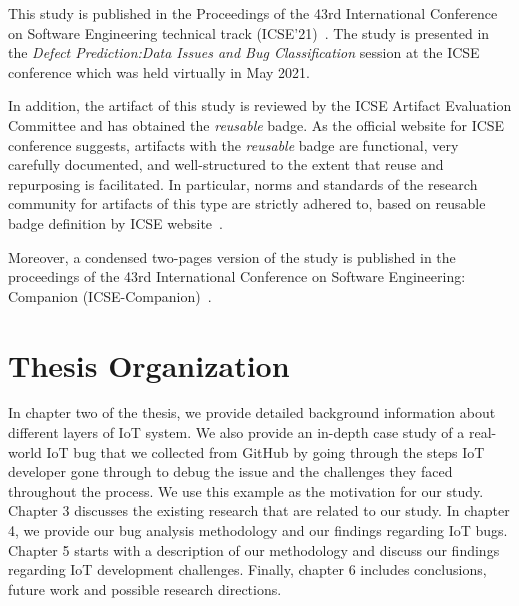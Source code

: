 This study is published in the Proceedings of the 43rd International Conference on Software Engineering technical track (ICSE'21)~\cite{makhshari2021iot}. The study is presented in the \textit{Defect Prediction:Data Issues and Bug Classification} session at the ICSE conference which was held virtually in May 2021.

In addition, the artifact of this study is reviewed by the ICSE Artifact Evaluation Committee and has obtained the \textit{reusable} badge. As the official website for ICSE conference suggests, artifacts with the \textit{reusable} badge are functional, very carefully documented, and well-structured to the extent that reuse and repurposing is facilitated. In particular, norms and standards of the research community for artifacts of this type are strictly adhered to, based on reusable badge definition by ICSE website~\cite{icseAE}.

Moreover, a condensed two-pages version of the study is published in the proceedings of the 43rd International Conference on Software Engineering: Companion (ICSE-Companion)~\cite{makhshari2021iotCompanion}.

\section{Thesis Organization }
In chapter two of the thesis, we provide detailed background information about different layers of IoT system. We also provide an in-depth case study of a real-world IoT bug that we collected from GitHub by going through the steps IoT developer gone through to debug the issue and the challenges they faced throughout the process. We use this example as the motivation for our study. Chapter 3 discusses the existing research that are related to our study. In chapter 4, we provide our bug analysis methodology and our findings regarding IoT bugs. Chapter 5 starts with a description of our methodology and discuss our findings regarding IoT development challenges. Finally, chapter 6 includes conclusions, future work and possible research directions.

\endinput

